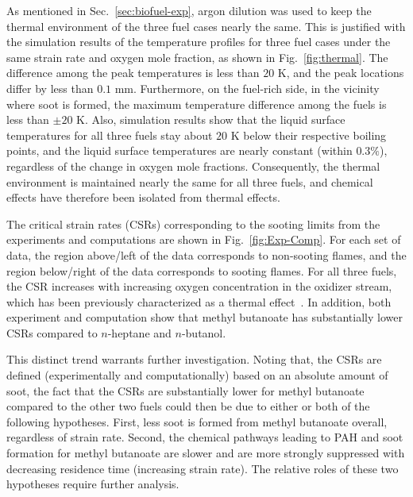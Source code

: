 As mentioned in Sec.~\ref{sec:biofuel-exp}, argon dilution was used to keep the thermal environment of the three fuel cases nearly the same.  This is justified with the simulation results of the temperature profiles for three fuel cases under the same strain rate and oxygen mole fraction, as shown in Fig.~\ref{fig:thermal}.  The difference among the peak temperatures is less than $20$ K, and the peak locations differ by less than $0.1$ mm.  Furthermore, on the fuel-rich side, in the vicinity where soot is formed, the maximum temperature difference among the fuels is less than $\pm20$ K.  Also, simulation results show that the liquid surface temperatures for all three fuels stay about $20$ K below their respective boiling points, and the liquid surface temperatures are nearly constant (within $0.3\%$), regardless of the change in oxygen mole fractions.  Consequently, the thermal environment is maintained nearly the same for all three fuels, and chemical effects have therefore been isolated from thermal effects. 

The critical strain rates (CSRs) corresponding to the sooting limits from the experiments and computations are shown in Fig.~\ref{fig:Exp-Comp}. For each set of data, the region above/left of the data corresponds to non-sooting flames, and the region below/right of the data corresponds to sooting flames. For all three fuels, the CSR increases with increasing oxygen concentration in the oxidizer stream, which has been previously characterized as a thermal effect~\cite{du91}. In addition, both experiment and computation show that methyl butanoate has substantially lower CSRs compared to  $n$-heptane and $n$-butanol. 

This distinct trend warrants further investigation.  Noting that, the CSRs are defined (experimentally and computationally) based on an absolute amount of soot, the fact that the CSRs are substantially lower for methyl butanoate compared to the other two fuels could then be due to either or both of the following hypotheses.  First, less soot is formed from methyl butanoate overall, regardless of strain rate.  Second, the chemical pathways leading to PAH and soot formation for methyl butanoate are slower and are more strongly suppressed with decreasing residence time (increasing strain rate).  The relative roles of these two hypotheses require further analysis.

